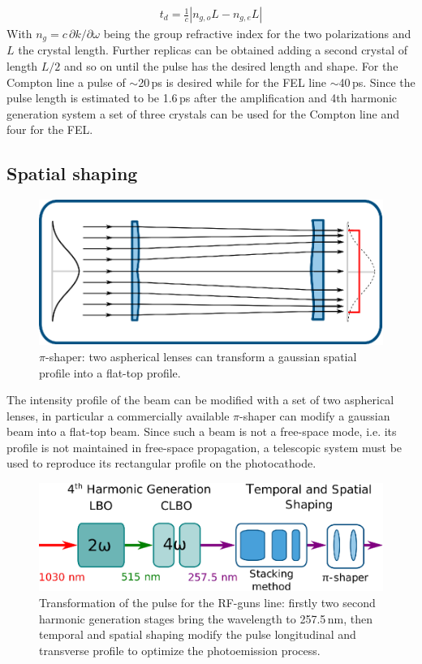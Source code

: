 \begin{align}
t_d = \frac{1}{c} \left|n_{g,o}L-n_{g,e}L\right|
\end{align}
With $n_g=c\,\partial k/\partial \omega$ being the group refractive index for the two polarizations and $L$ the crystal length.
Further replicas can be obtained adding a second crystal of length $L/2$ and so on until the pulse has the desired length and shape. For the Compton line a pulse of $\sim$20\,ps is desired while for the FEL line $\sim$40\,ps. Since the pulse length is estimated to be 1.6\,ps after the amplification and 4th harmonic generation system a set of three crystals can be used for the Compton line and four for the FEL.

\subsection{Spatial shaping}
\begin{figure}
	\centering
	\includegraphics[width=0.9\linewidth]{images/pishaper.eps}
	\caption{$\pi$-shaper: two aspherical lenses can transform a gaussian spatial profile into a flat-top profile.}
	\label{fig:pishaper}
\end{figure}
The intensity profile of the beam can be modified with a set of two aspherical lenses, in particular a commercially available $\pi$-shaper can modify a gaussian beam into a flat-top beam.
Since such a beam is not a free-space mode, i.e. its profile is not maintained in free-space propagation, a telescopic system must be used to reproduce its rectangular profile on the photocathode.
\begin{figure}
	\centering
	\includegraphics[width=0.9\linewidth]{images/rfgun.eps}
	\caption{Transformation of the pulse for the RF-guns line: firstly two second harmonic generation stages bring the wavelength to 257.5\,nm, then temporal and spatial shaping modify the pulse longitudinal and transverse profile to optimize the photoemission process.}
	\label{fig:rfgun}
\end{figure}

